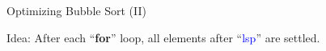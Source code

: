 \begin{frame}{Optimizing Bubble Sort (II)}

  Idea: After each ``{\bf for}'' loop, all elements after ``\textcolor{blue}{lsp}'' are settled.

  
\end{frame}
